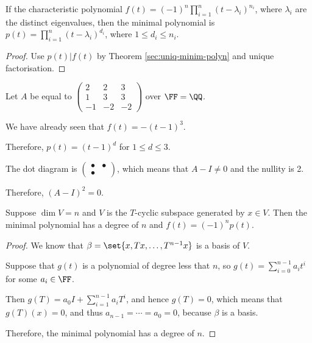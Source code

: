 \documentclass[11pt]{scrartcl}
\begin{document}
\begin{corollary}
  If the characteristic polynomial
  $f(t) = (-1)^n\prod_{i=1}^n(t-\lambda_i)^{n_i}$, where $\lambda_i$
  are the distinct eigenvalues, then the minimal polynomial is
  $p(t) = \prod_{i=1}^n(t-\lambda_i)^{d_i}$, where
  $1 \leq d_i \leq n_i$.
\end{corollary}

\begin{proof}
  \hfill

Use $p(t) | f(t)$ by Theorem \ref{sec:uniq-minim-polyn} and unique factorisation.

\end{proof}

\begin{example}

Let $A$ be equal to 
$
\begin{pmatrix}
2 & 2 & 3\\
1 & 3 & 3\\
-1 & -2 & -2
\end{pmatrix}
$ over $\FF= \QQ$. 

We have already seen that $f(t) = -(t-1)^3$.

Therefore, $p(t) = (t-1)^d$ for $1\leq d \leq 3$.

The dot diagram is $
\begin{pmatrix}
\bullet & \bullet\\
\bullet
\end{pmatrix}
$, which means that $A-I \neq 0$ and the nullity is 2.

Therefore, $(A-I)^2= 0$.

\end{example}

\begin{theorem}
  Suppose $\dim V = n$ and $V$ is the $T$-cyclic subspace generated by
  $x\in V$. Then the minimal polynomial has a degree of $n$ and
  $f(t) = (-1)^np(t)$.
\end{theorem}

\begin{proof}
  \hfill

We know that $\beta=\set{x, Tx, \dots, T^{n-1}x}$ is a basis of $V$.

Suppose that $g(t)$ is a polynomial of degree less that $n$, so
$g(t) = \sum_{i=0}^{n-1}a_{i}t^i$ for some $a_i \in \FF$.

Then $g(T) = a_0I+ \sum_{i=1}^{n-1}a_iT^i$, and hence $g(T) = 0$,
which means that $g(T)(x) = 0$, and thus $a_{n-1} = \cdots = a_0 = 0$,
because $\beta$ is a basis. 

Therefore, the minimal polynomial has a degree of $n$.
\end{proof}
\end{document}
